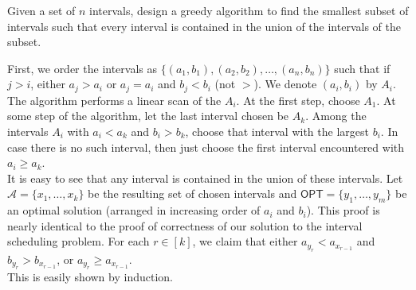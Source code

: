 
\begin{exercise}
	Given a set of $n$ intervals, design a greedy algorithm to find the smallest subset of intervals such that every interval is contained in the union of the intervals of the subset.
\end{exercise}
\begin{solution*}
	First, we order the intervals as $\{(a_1,b_1),(a_2,b_2),\ldots,(a_n,b_n)\}$ such that if $j>i$, either $a_j>a_i$ or $a_j=a_i$ and $b_j<b_i$ (not $>$). We denote $(a_i,b_i)$ by $A_i$.\\
	The algorithm performs a linear scan of the $A_i$. At the first step, choose $A_1$. At some step of the algorithm, let the last interval chosen be $A_k$. Among the intervals $A_i$ with $a_i<a_k$ and $b_i>b_k$, choose that interval with the largest $b_i$. In case there is no such interval, then just choose the first interval encountered with $a_i\geq a_k$.\\

	It is easy to see that any interval is contained in the union of these intervals. Let $\mathcal{A}=\{x_1,\ldots,x_k\}$ be the resulting set of chosen intervals and $\mathsf{OPT}=\{y_1,\ldots,y_m\}$ be an optimal solution (arranged in increasing order of $a_i$ and $b_i$).
	This proof is nearly identical to the proof of correctness of our solution to the interval scheduling problem. For each $r\in[k]$, we claim that either $a_{y_r}<a_{x_{r-1}}$ and $b_{y_r}>b_{x_{r-1}}$, or $a_{y_r}\geq a_{x_{r-1}}$.\\ 
	This is easily shown by induction. 
\end{solution*}

